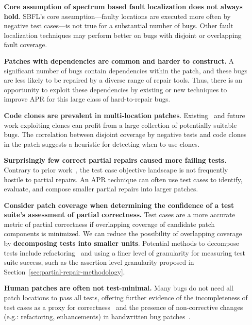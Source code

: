 \documentclass[sigconf, timestamp-false, anonymous=true]{acmart}
\begin{document}
\noindent\textbf{Core assumption of spectrum based fault localization does not always hold}. 
SBFL's core assumption---faulty locations are executed more often by negative test 
cases---is not true for a substantial number of bugs. Other fault localization techniques may 
perform better on bugs with disjoint or overlapping fault coverage.

\vspace{1ex}
\noindent\textbf{Patches with dependencies are common and harder to construct.} 
A significant number of bugs contain dependencies within the patch, 
and these bugs are less likely to be repaired by a diverse range of repair tools. 
Thus, there is an opportunity to exploit these dependencies by existing or new 
techniques to improve APR for this large class of hard-to-repair bugs.

\vspace{1ex}
\noindent\textbf{Code clones are prevalent in multi-location patches}. 
Existing~\cite{saha2019harnessing} and future work exploiting clones 
can profit from a large collection of potentially suitable bugs. 
The correlation between disjoint coverage by negative tests and 
code clones in the patch suggests a heuristic for detecting when 
to use clones.


\vspace{1ex}
\noindent\textbf{Surprisingly few correct partial repairs caused more failing tests.}
Contrary to prior work~\cite{gecco09}, 
the test case objective landscape is not frequently hostile to partial repairs. 
An APR technique can often use test cases to identify, evaluate, and compose 
smaller partial repairs into larger patches.

\vspace{1ex}
\noindent\textbf{Consider patch coverage when determining the confidence of a test suite's assessment of partial correctness.} 
Test cases are a more accurate metric of partial correctness if 
overlapping coverage of candidate patch components is minimized.
We can reduce the possibility of overlapping coverage by 
\textbf{decomposing tests into smaller units}.
Potential methods to decompose tests include refactoring~\cite{b-refactoring}
and using a finer level of granularity for measuring test suite success, 
such as the assertion level granularity proposed in Section~\ref{sec:partial-repair-methodology}.

\vspace{1ex}
\noindent\textbf{Human patches are often not test-minimal.} 
Many bugs do not need all patch locations to pass all tests, 
offering further evidence of the incompleteness of test cases as a 
proxy for correctness~\cite{patch-correctness} and the 
presence of non-corrective changes (e.g.: refactoring, enhancements)
in handwritten bug patches~\cite{api-refactoring, tangledchanges}.
\end{document}
